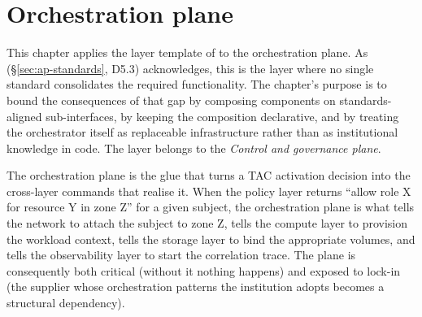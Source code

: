 
\chapter{Orchestration plane}
\label{ch:orchestration}

\begin{caveatbox}
\noindent This chapter applies the layer template of
 to the orchestration plane. As
 (\S\ref{sec:ap-standards}, D5.3) acknowledges,
this is the layer where no single standard consolidates the
required functionality. The chapter's purpose is to bound the
consequences of that gap by composing components on standards-aligned
sub-interfaces, by keeping the composition declarative, and by
treating the orchestrator itself as replaceable infrastructure
rather than as institutional knowledge in code. The layer belongs
to the \emph{Control and governance plane}.
\end{caveatbox}

The orchestration plane is the glue that turns a TAC activation
decision into the cross-layer commands that realise it. When the
policy layer returns ``allow role X for resource Y in zone Z'' for
a given subject, the orchestration plane is what tells the network
to attach the subject to zone Z, tells the compute layer to
provision the workload context, tells the storage layer to bind the
appropriate volumes, and tells the observability layer to start the
correlation trace. The plane is consequently both critical (without
it nothing happens) and exposed to lock-in (the supplier whose
orchestration patterns the institution adopts becomes a structural
dependency).

